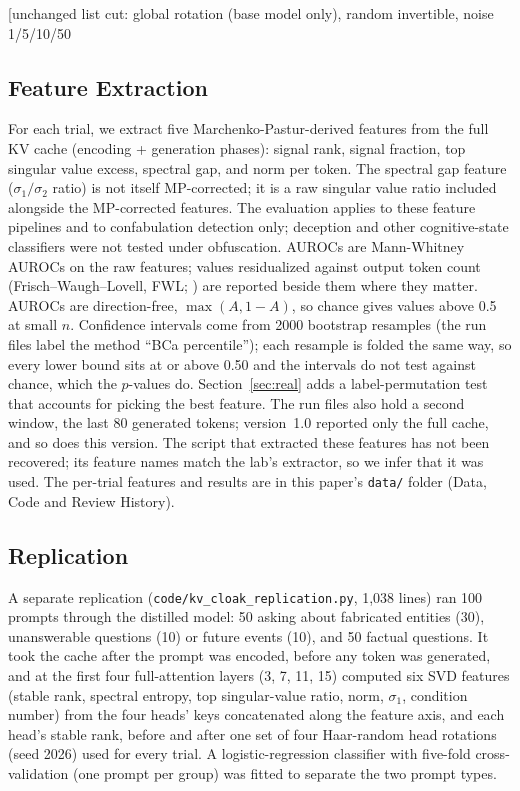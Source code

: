 [unchanged list cut: global rotation (base model only), random invertible, noise 1/5/10/50%

\subsection{Feature Extraction}

For each trial, we extract five Marchenko-Pastur-derived features from
the full KV cache (encoding + generation phases): signal rank, signal
fraction, top singular value excess, spectral gap, and norm per token.
The spectral gap feature ($\sigma_1/\sigma_2$ ratio) is not itself
MP-corrected; it is a raw singular value ratio included alongside the
MP-corrected features. The evaluation applies to these feature pipelines
and to confabulation detection only; deception and other cognitive-state
classifiers were not tested under obfuscation. AUROCs are Mann-Whitney
AUROCs on the raw features; values residualized against output token
count (Frisch--Waugh--Lovell, FWL;
\citealp{frisch1933partial,lovell1963seasonal}) are reported beside them
where they matter. AUROCs are direction-free, $\max(A, 1-A)$, so chance
gives values above 0.5 at small $n$. Confidence intervals come from 2000
bootstrap resamples (the run files label the method ``BCa percentile'');
each resample is folded the same way, so every lower bound sits at or
above 0.50 and the intervals do not test against chance, which the
$p$-values do. Section~\ref{sec:real} adds a label-permutation test that
accounts for picking the best feature. The run files also hold a second
window, the last 80 generated tokens; version~1.0 reported only the full
cache, and so does this version. The script that extracted these features
has not been recovered; its feature names match the lab's extractor, so
we infer that it was used. The per-trial features and results are in this
paper's \texttt{data/} folder (Data, Code and Review History).

\subsection{Replication}
\label{sec:method_rep}

A separate replication (\texttt{code/kv\_cloak\_replication.py},
1,038 lines) ran 100 prompts through the distilled model: 50 asking about
fabricated entities (30), unanswerable questions (10) or future events
(10), and 50 factual questions. It took the cache after the prompt was
encoded, before any token was generated, and at the first four
full-attention layers (3, 7, 11, 15) computed six SVD features (stable
rank, spectral entropy, top singular-value ratio, norm, $\sigma_1$,
condition number) from the four heads' keys concatenated along the
feature axis, and each head's stable rank, before and after one set of
four Haar-random head rotations (seed 2026) used for every trial. A
logistic-regression classifier with five-fold cross-validation (one
prompt per group) was fitted to separate the two prompt types.

